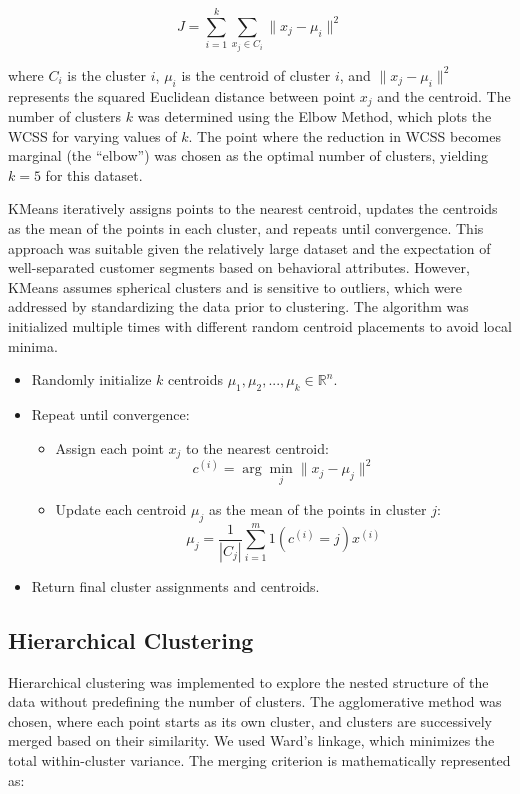 \documentclass[runningheads,a4paper]{llncs}
\begin{document}
\begin{equation}
J = \sum_{i=1}^{k} \sum_{x_j \in C_i} \| x_j - \mu_i \|^2
\end{equation}

where \( C_i \) is the cluster \( i \), \( \mu_i \) is the centroid of cluster \( i \), and \( \| x_j - \mu_i \|^2 \) represents the squared Euclidean distance between point \( x_j \) and the centroid. The number of clusters \( k \) was determined using the Elbow Method, which plots the WCSS for varying values of \( k \). The point where the reduction in WCSS becomes marginal (the “elbow”) was chosen as the optimal number of clusters, yielding \( k = 5 \) for this dataset. 

KMeans iteratively assigns points to the nearest centroid, updates the centroids as the mean of the points in each cluster, and repeats until convergence. This approach was suitable given the relatively large dataset and the expectation of well-separated customer segments based on behavioral attributes. However, KMeans assumes spherical clusters and is sensitive to outliers, which were addressed by standardizing the data prior to clustering. The algorithm was initialized multiple times with different random centroid placements to avoid local minima.

\begin{itemize}
    \item Randomly initialize \( k \) centroids \( \mu_1, \mu_2, ..., \mu_k \in \mathbb{R}^n \).
    \item Repeat until convergence:
    \begin{itemize}
        \item Assign each point \( x_j \) to the nearest centroid:
        \[
        c^{(i)} = \arg\min_{j} \| x_j - \mu_j \|^2
        \]
        \item Update each centroid \( \mu_j \) as the mean of the points in cluster \( j \):
        \[
        \mu_j = \frac{1}{|C_j|} \sum_{i=1}^{m} 1(c^{(i)} = j) x^{(i)}
        \]
    \end{itemize}
    \item Return final cluster assignments and centroids.
\end{itemize}

\subsection{Hierarchical Clustering}

Hierarchical clustering was implemented to explore the nested structure of the data without predefining the number of clusters. The agglomerative method was chosen, where each point starts as its own cluster, and clusters are successively merged based on their similarity. We used Ward’s linkage, which minimizes the total within-cluster variance. The merging criterion is mathematically represented as:
\end{document}
